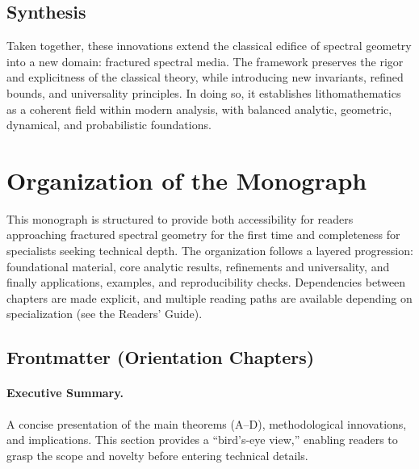 \subsection*{Synthesis}

Taken together, these innovations extend the classical edifice of
spectral geometry into a new domain: fractured spectral media. The
framework preserves the rigor and explicitness of the classical theory,
while introducing new invariants, refined bounds, and universality
principles. In doing so, it establishes lithomathematics as a coherent
field within modern analysis, with balanced analytic, geometric,
dynamical, and probabilistic foundations.


\section{Organization of the Monograph}

This monograph is structured to provide both accessibility for readers
approaching fractured spectral geometry for the first time and
completeness for specialists seeking technical depth. The organization
follows a layered progression: foundational material, core analytic
results, refinements and universality, and finally applications,
examples, and reproducibility checks. Dependencies between chapters are
made explicit, and multiple reading paths are available depending on
specialization (see the Readers’ Guide).

\subsection*{Frontmatter (Orientation Chapters)}

\paragraph{Executive Summary.}
A concise presentation of the main theorems (A–D), methodological
innovations, and implications. This section provides a “bird’s-eye
view,” enabling readers to grasp the scope and novelty before entering
technical details.

